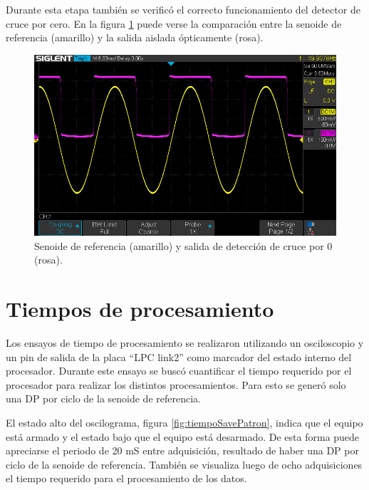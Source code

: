 \newpage

Durante esta etapa también se verificó el correcto funcionamiento del detector de cruce por cero. En la figura \ref{fig:zeroCross} puede verse la comparación entre la senoide de referencia (amarillo)  y la salida aislada ópticamente (rosa).

\vspace{5mm}

\begin{figure}[ht]
	\centering
	\includegraphics[width=133mm]{./Figures/zeroCross.png}
	\caption{Senoide de referencia (amarillo) y salida de detección de cruce por 0 (rosa).}
	\label{fig:zeroCross}
\end{figure}

\vspace{5mm}

\section{Tiempos de procesamiento}
Los ensayos de tiempo de procesamiento se realizaron utilizando un osciloscopio y un pin de salida de la placa \enquote{LPC link2} como marcador del estado interno del procesador. Durante este ensayo se buscó cuantificar el tiempo requerido por el procesador para realizar los distintos procesamientos. Para esto se generó solo una DP por ciclo de la senoide de referencia. 

El estado alto del oscilograma, figura \ref{fig:tiempoSavePatron}, indica que el equipo está armado y el estado bajo que el equipo está desarmado. De esta forma puede apreciarse el periodo de 20 mS entre adquisición, resultado de haber una DP por ciclo de la senoide de referencia. También se visualiza luego de ocho adquisiciones el tiempo requerido para el procesamiento de los datos. 

